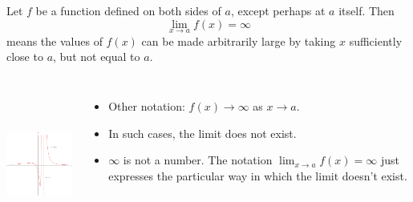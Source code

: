 \begin{frame}
\begin{definition}
Let $f$ be a function defined on both sides of $a$, except perhaps at $a$ itself.  Then
\[
\lim_{x\rightarrow a}f(x) = \infty 
\]
means the values of $f(x)$ can be made arbitrarily large by taking $x$ sufficiently close to $a$, but not equal to $a$.
\end{definition}
\begin{columns}[c]
\ \includegraphics[height=4cm]{limits/pictures/02-02-posinf.pdf}%
\begin{itemize}
\item<2->  Other notation: $f(x) \rightarrow \infty $ as $x\rightarrow a$.
\item<3->  In such cases, the limit does not exist.
\item<4->  $\infty$ is not a number.  The notation $\lim_{x\rightarrow a}f(x) = \infty$ just expresses the particular way in which the limit doesn't exist.
\end{itemize}
\end{columns}
\end{frame}




